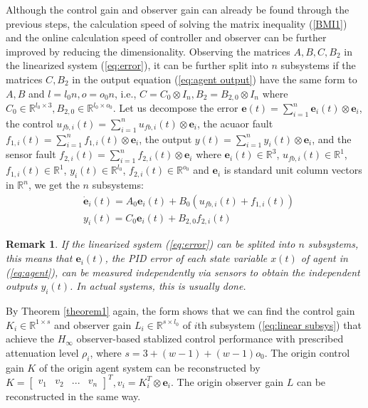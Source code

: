 \documentclass{ieeeaccess}
\newtheorem{remark}{Remark}
\begin{document}
Although the control gain and observer gain can already be found through the previous steps, the calculation speed of solving the matrix inequality (\ref{BMI1}) and the online calculation speed of controller and observer can be further improved by reducing the dimensionality. Observing the matrices $A,B,C,B_2$ in the linearized system (\ref{eq:error}), it can be further split into $n$ subsystems if the matrices $C,B_2$ in the output equation (\ref{eq:agent output}) have the same form to $A,B$ and $l=l_0n, o=o_0n$, i.e., $C = C_0\otimes I_n,B_2 = B_{2,0}\otimes I_n$ where $C_0\in\mathbb{R}^{l_0\times 3},B_{2,0}\in\mathbb{R}^{l_0\times o_0}$. Let us decompose the error $\pmb{e}(t)=\sum_{i=1}^{n} \pmb{e}_i(t)\otimes\mathbf{e}_i$, the control $u_{fb,i}(t)=\sum_{i=1}^{n} {u}_{fb,i}(t)\otimes\mathbf{e}_i$, the acuaor fault $f_{1,i}(t)=\sum_{i=1}^{n} {f}_{1,i}(t)\otimes\mathbf{e}_i$, the output $y(t)=\sum_{i=1}^{n} {y}_i(t)\otimes\mathbf{e}_i$, and the sensor fault $f_{2,i}(t)=\sum_{i=1}^{n} {f}_{2,i}(t)\otimes\mathbf{e}_i$ where $\pmb{e}_i(t)\in\mathbb{R}^3$, $u_{fb,i}(t)\in\mathbb{R}^1$, $f_{1,i}(t)\in\mathbb{R}^1$, $y_i(t)\in\mathbb{R}^{l_0}$, $f_{2,i}(t)\in\mathbb{R}^{o_0}$ and $\mathbf{e}_i$ is standard unit column vectors in $\mathbb{R}^n$, we get the $n$ subsystems:
\begin{equation} \label{eq:linear subsys}
    \begin{split}
        & \dot{\pmb{e}}_i(t)=A_0\pmb{e}_i(t)+B_0(u_{fb,i}(t)+f_{1,i}(t)) \\
        & {y}_i(t)=C_0\pmb{e}_i(t)+B_{2,0}f_{2,i}(t)   
    \end{split}
\end{equation}
\begin{remark}
    If the linearized system (\ref{eq:error}) can be splited into $n$ subsystems, this means that $\pmb{e}_i(t)$, the PID error of each state variable $x(t)$ of agent in (\ref{eq:agent}), can be measured independently via sensors to obtain the independent outputs $y_i(t)$. In actual systems, this is usually done.
\end{remark}

By Theorem \ref{theorem1} again, the form shows that we can find the control gain $K_i\in\mathbb{R}^{1\times s}$ and observer gain $L_i\in\mathbb{R}^{s\times l_0}$ of $i$th subsystem (\ref{eq:linear subsys}) that achieve the $H_\infty$ observer-based stablized control performance with prescribed attenuation level $\rho_i$, where $s=3+(w-1)+(w-1)o_0$. The origin control gain $K$ of the origin agent system can be reconstructed by $K = \begin{bmatrix}
    \mathit{v}_1 & \mathit{v}_2 & ... & \mathit{v}_n
\end{bmatrix}^T, \mathit{v}_i=K_i^T\otimes\mathbf{e}_i$. The origin observer gain $L$ can be reconstructed in the same way. 
\end{document}
